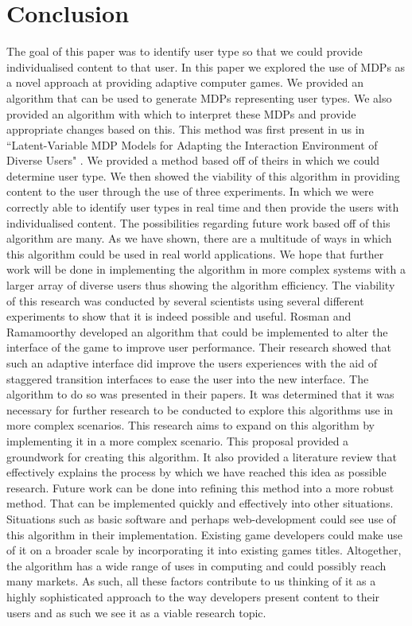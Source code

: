 \documentclass[11pt]{article}
\begin{document}
\section{Conclusion}
The goal of this paper was to identify user type so that we could provide individualised content to that user. In this paper we explored the use of MDPs as a novel approach at providing adaptive computer games. We provided an algorithm that can be used to generate MDPs representing user types. We also provided an algorithm with which to interpret these MDPs and provide appropriate changes based on this. This method was first present in us in ``Latent-Variable MDP Models for Adapting the Interaction Environment of Diverse Users" \cite{ramamoorthy2013latent}. We provided a method based off of theirs in which we could determine user type. We then showed the viability of this algorithm in providing content to the user through the use of three experiments. In which we were correctly able to identify user types in real time and then provide the users with individualised content. The possibilities regarding future work based off of this algorithm are many. As we have shown, there are a multitude of ways in which this algorithm could be used in real world applications. We hope that further work will be done in implementing the algorithm in more complex systems with a larger array of diverse users thus showing the algorithm efficiency.
\vspace{6.0 mm}
The viability of this research was conducted by several scientists using several different experiments to show that it is indeed possible and useful. Rosman and Ramamoorthy \citep{rosman2014user} developed an algorithm that could be implemented to alter the interface of the game to improve user performance. Their research showed that such an adaptive interface did improve the users experiences with the aid of staggered transition interfaces to ease the user into the new interface. The algorithm to do so was presented in their papers. It was determined that it was necessary for further research to be conducted to explore this algorithms use in more complex scenarios. This research aims to expand on this algorithm by implementing it in a more complex scenario.
This proposal provided a groundwork for creating this algorithm. It also provided a literature review that effectively explains the process by which we have reached this idea as possible research. 
\vspace{6.0 mm}
Future work can be done into refining this method into a more robust method. That can be implemented quickly and effectively into other situations. Situations such as basic software and perhaps web-development could see use of this algorithm in their implementation. Existing game developers could make use of it on a broader scale by incorporating it into existing games titles. Altogether, the algorithm has a wide range of uses in computing and could possibly reach many markets. As such, all these factors contribute to us thinking of it as a highly sophisticated approach to the way developers present content to their users and as such we see it as a viable research topic.

\clearpage

\end{document}
